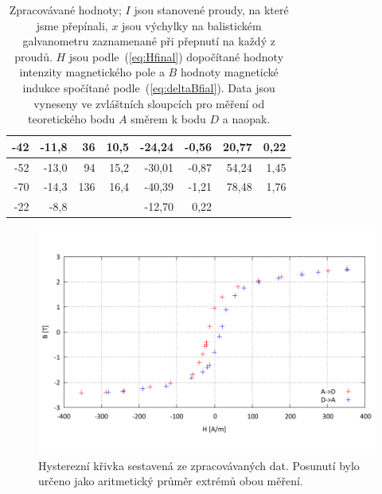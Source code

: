 \documentclass[english]{article}
\begin{document}
\begin{table}[htbp]
\begin{tabular}{|r|r|r|r|r|r|r|r|}
\hline
-42   & -11,8 & 36    & 10,5  & -24,24 & -0,56 & 20,77 & 0,22 \bigstrut\\
\hline
-52   & -13,0 & 94    & 15,2  & -30,01 & -0,87 & 54,24 & 1,45 \bigstrut\\
\hline
-70   & -14,3 & 136   & 16,4  & -40,39 & -1,21 & 78,48 & 1,76 \bigstrut\\
\hline
-22   & -8,8  & \multicolumn{1}{r}{} &       & -12,70 & 0,22  & \multicolumn{1}{r}{} & \multicolumn{1}{r}{} \bigstrut\\
\cline{1-2}\cline{5-6}\end{tabular}%
  \caption{Zpracovávané hodnoty; $I$ jsou stanovené proudy, na které jsme přepínali, $x$ jsou výchylky na balistickém galvanometru zaznamenané při přepnutí na každý z proudů. $H$ jsou podle~(\ref{eq:Hfinal}) dopočítané hodnoty intenzity magnetického pole a $B$ hodnoty magnetické indukce spočítané podle~(\ref{eq:deltaBfial}). Data jsou vyneseny ve zvláštních sloupcích pro měření od teoretického bodu $A$ směrem k bodu $D$ a naopak.
					 }
   \label{tab:data}%
\end{table}%

	\begin{figure}[h!]
	\begin{center}
	    \vspace*{-1cm}
		\includegraphics[width=\linewidth]{../gnuplot/hyst.pdf}
	    \vspace*{-2cm}
		\caption{Hysterezní křivka sestavená ze zpracovávaných dat. Posunutí bylo určeno jako aritmetický průměr extrémů obou měření.}
		\label{fig:g_hyst}
	\end{center}
	\end{figure}
				
\end{document}
